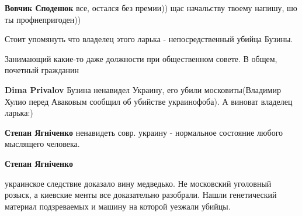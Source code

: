 \begin{itemize}
\begin{itemize}
 
\textbf{Вовчик Споденюк} все, остался без премии)) щас начальству твоему напишу, шо ты профнепригоден))

\end{itemize}

 

Стоит упомянуть что владелец этого ларька - непосредственный убийца Бузины.


Занимающий какие-то даже должности при общественном совете. В общем, почетный
гражданин

\begin{itemize}
 
\textbf{Dima Privalov} Бузина ненавидел Украину, его убили московиты(Владимир
Хулио перед Аваковым сообщил об убийстве украинофоба). А виноват владелец
ларька:)

 
\textbf{Степан Ягніченко} ненавидеть совр. украину - нормальное состояние любого мыслящего человека.

 
\textbf{Степан Ягніченко} 

украинское следствие доказало вину медведько. Не
московский уголовный розыск, а киевские менты все доказательно разобрали. Нашли
генетический материал подзреваемых и машину на которой уезжали убийцы.


\end{itemize}
\end{itemize}
